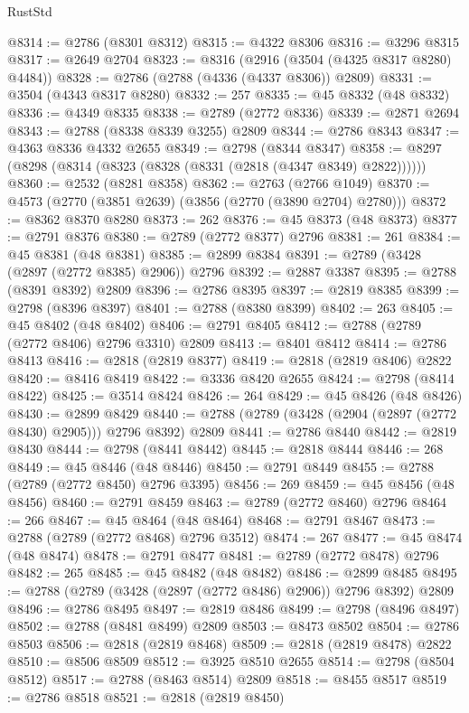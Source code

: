 \begin{lexlean}{RustStd}
\begin{coremodule}
@8314 := @2786 (@8301 @8312)
@8315 := @4322 @8306
@8316 := @3296 @8315
@8317 := @2649 @2704
@8323 := @8316 (@2916 (@3504 (@4325 @8317 @8280) @4484))
@8328 := @2786 (@2788 (@4336 (@4337 @8306)) @2809)
@8331 := @3504 (@4343 @8317 @8280)
@8332 := 257
@8335 := @45 @8332 (@48 @8332)
@8336 := @4349 @8335
@8338 := @2789 (@2772 @8336)
@8339 := @2871 @2694
@8343 := @2788 (@8338 @8339 @3255) @2809
@8344 := @2786 @8343
@8347 := @4363 @8336 @4332 @2655
@8349 := @2798 (@8344 @8347)
@8358 := @8297 (@8298 (@8314 (@8323 (@8328 (@8331 (@2818 (@4347 @8349) @2822))))))
@8360 := @2532 (@8281 @8358)
@8362 := @2763 (@2766 @1049)
@8370 := @4573 (@2770 (@3851 @2639) (@3856 (@2770 (@3890 @2704) @2780)))
@8372 := @8362 @8370 @8280
@8373 := 262
@8376 := @45 @8373 (@48 @8373)
@8377 := @2791 @8376
@8380 := @2789 (@2772 @8377) @2796
@8381 := 261
@8384 := @45 @8381 (@48 @8381)
@8385 := @2899 @8384
@8391 := @2789 (@3428 (@2897 (@2772 @8385) @2906)) @2796
@8392 := @2887 @3387
@8395 := @2788 (@8391 @8392) @2809
@8396 := @2786 @8395
@8397 := @2819 @8385
@8399 := @2798 (@8396 @8397)
@8401 := @2788 (@8380 @8399)
@8402 := 263
@8405 := @45 @8402 (@48 @8402)
@8406 := @2791 @8405
@8412 := @2788 (@2789 (@2772 @8406) @2796 @3310) @2809
@8413 := @8401 @8412
@8414 := @2786 @8413
@8416 := @2818 (@2819 @8377)
@8419 := @2818 (@2819 @8406) @2822
@8420 := @8416 @8419
@8422 := @3336 @8420 @2655
@8424 := @2798 (@8414 @8422)
@8425 := @3514 @8424
@8426 := 264
@8429 := @45 @8426 (@48 @8426)
@8430 := @2899 @8429
@8440 := @2788 (@2789 (@3428 (@2904 (@2897 (@2772 @8430) @2905))) @2796 @8392) @2809
@8441 := @2786 @8440
@8442 := @2819 @8430
@8444 := @2798 (@8441 @8442)
@8445 := @2818 @8444
@8446 := 268
@8449 := @45 @8446 (@48 @8446)
@8450 := @2791 @8449
@8455 := @2788 (@2789 (@2772 @8450) @2796 @3395)
@8456 := 269
@8459 := @45 @8456 (@48 @8456)
@8460 := @2791 @8459
@8463 := @2789 (@2772 @8460) @2796
@8464 := 266
@8467 := @45 @8464 (@48 @8464)
@8468 := @2791 @8467
@8473 := @2788 (@2789 (@2772 @8468) @2796 @3512)
@8474 := 267
@8477 := @45 @8474 (@48 @8474)
@8478 := @2791 @8477
@8481 := @2789 (@2772 @8478) @2796
@8482 := 265
@8485 := @45 @8482 (@48 @8482)
@8486 := @2899 @8485
@8495 := @2788 (@2789 (@3428 (@2897 (@2772 @8486) @2906)) @2796 @8392) @2809
@8496 := @2786 @8495
@8497 := @2819 @8486
@8499 := @2798 (@8496 @8497)
@8502 := @2788 (@8481 @8499) @2809
@8503 := @8473 @8502
@8504 := @2786 @8503
@8506 := @2818 (@2819 @8468)
@8509 := @2818 (@2819 @8478) @2822
@8510 := @8506 @8509
@8512 := @3925 @8510 @2655
@8514 := @2798 (@8504 @8512)
@8517 := @2788 (@8463 @8514) @2809
@8518 := @8455 @8517
@8519 := @2786 @8518
@8521 := @2818 (@2819 @8450)

\end{coremodule}
\end{lexlean}
